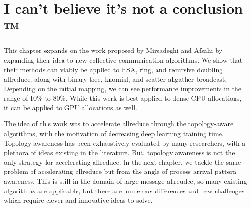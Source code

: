 \section{I can't believe it's not a conclusion ™}
This chapter expands on the work proposed by Mirsadeghi and Afsahi \cite{Mirsadeghi2016TopoAwareCollRR} by expanding their idea to new collective communication algorithms.
We show that their methods can viably be applied to RSA, ring, and recursive doubling allreduce, along with binary-tree, knomial, and scatter-allgather broadcast.
Depending on the initial mapping, we can see performance improvements in the range of 10\% to 80\%.
While this work is best applied to dense CPU allocations, it can be applied to GPU allocations as well. 

The idea of this work was to accelerate allreduce through the topology-aware algorithms, with the motivation of decreasing deep learning training time.
Topology awareness has been exhaustively evaluated by many researchers, with a plethora of ideas existing in the literature.
But, topology awareness is not the only strategy for accelerating allreduce.
In the next chapter, we tackle the same problem of accelerating allreduce but from the angle of process arrival pattern awareness.
This is still in the domain of large-message allreudce, so many existing algorithms are applicable, but there are numerous differences and new challenges which require clever and innovative ideas to solve.

